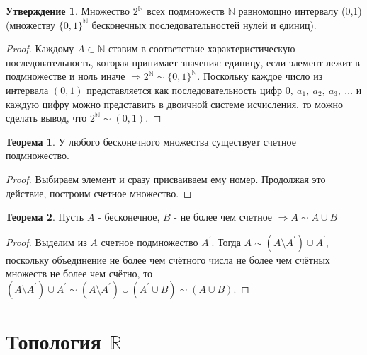 \documentclass[a4paper, 12pt]{article}
\newcommand{\N}{\mathbb{N}}
\newcommand{\R}{\mathbb{R}}
\theoremstyle{definition}
\newtheorem*{theorem}{Теорема}
\newtheorem*{statement}{Утверждение}
\begin{document}
        \begin{statement}
            Множество $2^{\N}$ всех подмножеств $\N$ равномощно интервалу (0,1) (множеству $\{0,1\}^{\N}$ бесконечных последовательностей нулей и единиц).
        \end{statement}
        \begin{proof}
            Каждому $A\subset \N$ ставим в соответствие характеристическую последовательность, которая принимает значения: единицу, если элемент лежит в подмножестве и ноль иначе $\Rightarrow 2^{\N}\sim \{0,1\}^{\N}$. Поскольку каждое число из интервала $(0,1)$ представляется как последовательность цифр $0,\ a_1,\ a_2,\ a_3,\ \dots$ и каждую цифру можно представить в двоичной системе исчисления, то можно сделать вывод, что $2^{\N}\sim (0,1)$.
        \end{proof}
        \begin{theorem}
            У любого бесконечного множества существует счетное подмножество.
        \end{theorem} 
        \begin{proof}
            Выбираем элемент и сразу присваиваем ему номер. Продолжая это действие, построим счетное множество.
        \end{proof}
        \begin{theorem}
            Пусть $A$ - бесконечное, $B$ - не более чем счетное $\Rightarrow A\sim A\cup B$
        \end{theorem} 
        \begin{proof}
            Выделим из $A$ счетное подмножество $A^{\prime}$. Тогда $A\sim (A\setminus A^{\prime})\cup A^{\prime}$, поскольку объединение не более чем счётного числа не более чем счётных множеств не более чем счётно, то  $(A\setminus A^{\prime})\cup A^{\prime} \sim (A\setminus A^{\prime})\cup(A^{\prime}\cup B) \sim(A\cup B)$.
        \end{proof}
    \newpage
    \section{Топология $\R$}
\end{document}
